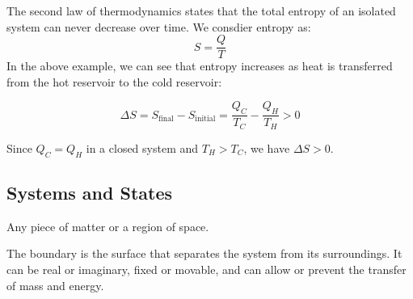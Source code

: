 \documentclass[11pt]{report}
\begin{document}
\begin{definition}
    The second law of thermodynamics states that the total entropy of an isolated system can never decrease over time. We consdier entropy as:
    \begin{equation}
        S = \frac{Q}{T}
    \end{equation}
    In the above example, we can see that entropy increases as heat is transferred from the hot reservoir to the cold reservoir:

    \begin{equation}
        \Delta S = S_{\text{final}} - S_{\text{initial}} = \frac{Q_C}{T_C} - \frac{Q_H}{T_H} > 0
    \end{equation}

    Since $Q_C = Q_H$ in a closed system and $T_H > T_C$, we have $\Delta S > 0$.
\end{definition}



\subsection{Systems and States}
\begin{definition}[System]
    Any piece of matter or a region of space.
\end{definition}

\begin{definition}[Boundary]
    The boundary is the surface that separates the system from its surroundings. It can be real or imaginary, fixed or movable, and can allow or prevent the transfer of mass and energy.
\end{definition}
\end{document}
